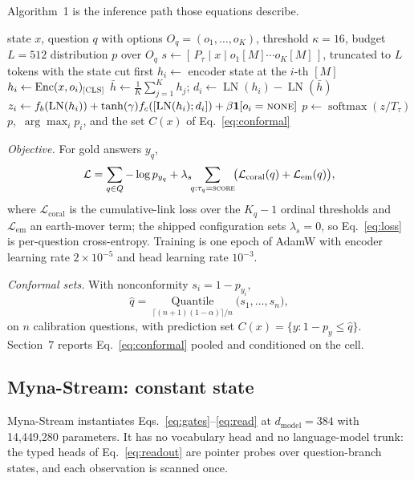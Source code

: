 \documentclass[11pt]{article}
\begin{document}
Algorithm~1 is the inference path those equations describe.

\begin{algorithm}[t]
\caption{Answering one typed question with Myna-v6{}.}
\begin{algorithmic}[1]
\Require state $x$, question $q$ with options $O_q=(o_1,\dots,o_K)$, threshold $\kappa=16$, budget $L=512$
\Ensure distribution $p$ over $O_q$
  \State $s\gets[\,P_\tau\mid x\mid o_1[M]\cdots o_K[M]\,]$, truncated to $L$ tokens with the state cut first
  \State $h_i\gets$ encoder state at the $i$-th $[M]$ 
\Else
    \State $h_i\gets\operatorname{Enc}(x,o_i)_{\textsc{[CLS]}}$ 
  \EndFor
  \State $\bar h\gets\tfrac{1}{K}\sum_{j=1}^{K}h_j$; \quad $d_i\gets\operatorname{LN}(h_i)-\operatorname{LN}(\bar h)$
  \State $z_i\gets f_b(\operatorname{LN}(h_i))+\tanh(\gamma)f_c([\operatorname{LN}(h_i);d_i])+\beta\mathbf{1}[o_i=\textsc{none}]$
\EndIf
\State $p\gets\operatorname{softmax}(z/T_\tau)$ 
\State \Return $p$, \,$\arg\max_i p_i$, and the set $C(x)$ of Eq.~\eqref{eq:conformal}
\end{algorithmic}
\end{algorithm}

\emph{Objective.} For gold answers $y_q$,
\begin{multline}
\mathcal{L} = \sum_{q\in Q} -\log p_{y_q}
 + \lambda_s \!\!\sum_{q:\tau_q=\textsc{score}}\!\! \big(\mathcal{L}_{\text{coral}}(q)
 + \mathcal{L}_{\text{em}}(q)\big), \end{multline}
where $\mathcal{L}_{\text{coral}}$ is the cumulative-link loss over the $K_q-1$ ordinal thresholds
and $\mathcal{L}_{\text{em}}$ an earth-mover term; the shipped configuration sets $\lambda_s=0$, so
Eq.~\eqref{eq:loss} is per-question cross-entropy. Training is one epoch of AdamW with encoder
learning rate $2\times10^{-5}$ and head learning rate $10^{-3}$.

\emph{Conformal sets.} With nonconformity $s_i=1-p_{y_i}$,
\begin{equation}
\hat q = \operatorname*{Quantile}_{\lceil (n+1)(1-\alpha)\rceil/n}\big(s_1,\dots,s_n\big),
\end{equation}
on $n$ calibration questions, with prediction set $C(x)=\{y:1-p_y\le\hat q\}$. Section~7 reports
Eq.~\eqref{eq:conformal} pooled and conditioned on the cell.

\subsection{Myna-Stream{}: constant state}
Myna-Stream{} instantiates Eqs.~\eqref{eq:gates}--\eqref{eq:read} at $d_{\text{model}}=384$ with
14{,}449{,}280 parameters. It has no vocabulary head and no language-model trunk: the typed heads of
Eq.~\eqref{eq:readout} are pointer probes over question-branch states, and each observation is
scanned once.
\end{document}
